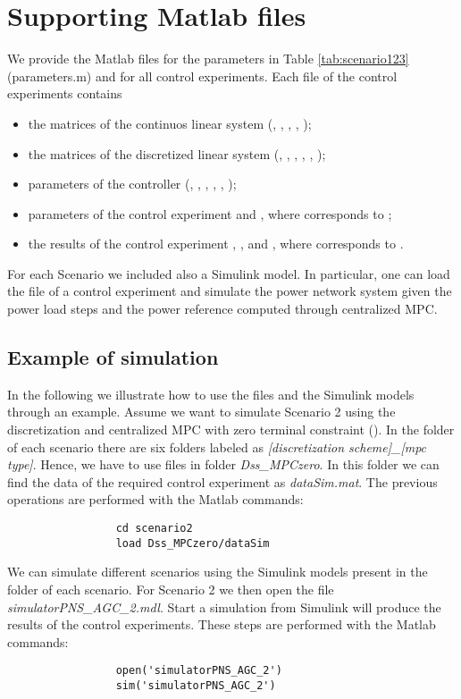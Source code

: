 \documentclass[a4paper]{article}
\begin{document}
          
     \section{Supporting Matlab files}

         We provide the Matlab files for the parameters in Table \ref{tab:scenario123} (\mbox{parameters.m}) and for all control experiments. Each file  of the control experiments contains 
         \begin{itemize}
         \item the matrices of the continuos linear system (, , , , );
         \item the matrices of the discretized linear system (, , , , , );
         \item parameters of the controller (, , , , , );
         \item parameters of the control experiment   and , where  corresponds to ;
         \item the results of the control experiment , ,  and , where  corresponds to .
         \end{itemize}
         
         For each Scenario we included also a Simulink model. In particular, one can load the file  of a control experiment and simulate the power network system given the power load steps and the power reference computed through centralized MPC.

          \subsection{Example of simulation}
               In the following we illustrate how to use the files  and the Simulink models through an example. Assume we want to simulate Scenario 2 using the discretization  and centralized MPC with zero terminal constraint (). In the folder of each scenario there are six folders labeled as \emph{[discretization scheme]\_[mpc type]}. Hence, we have to use files in folder \emph{Dss\_MPCzero}. In this folder we can find the data of the required control experiment as \emph{dataSim.mat}. The previous operations are performed with the Matlab commands:
               \begin{lstlisting}
                 cd scenario2
                 load Dss_MPCzero/dataSim
               \end{lstlisting}
               We can simulate different scenarios using the Simulink models present in the folder of each scenario. For Scenario 2 we then open the file \emph{simulatorPNS\_AGC\_2.mdl}. Start a simulation from Simulink will produce the results of the control experiments. These steps are performed with the Matlab commands:
               \begin{lstlisting}
                 open('simulatorPNS_AGC_2')
                 sim('simulatorPNS_AGC_2')
               \end{lstlisting}
\end{document}
